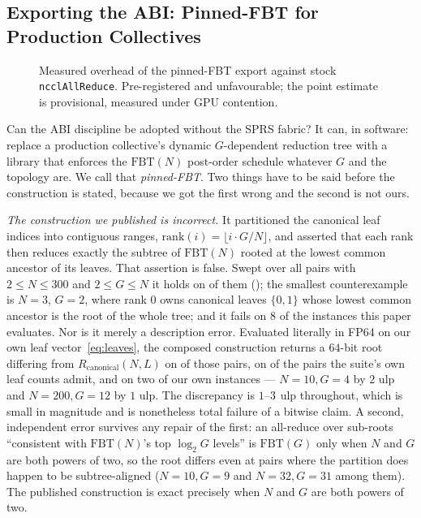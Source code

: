\documentclass[journal,10pt]{IEEEtran}
\theoremstyle{plain}
\theoremstyle{definition}
\theoremstyle{remark}
\newcommand{\FBT}{\ensuremath{\mathrm{FBT}}}
\newcommand{\Rcan}{\ensuremath{R_{\mathrm{canonical}}}}
\newcommand{\sprs}{\textsc{SPRS}}
\begin{document}
\subsection{Exporting the ABI: Pinned-FBT for Production Collectives}\label{sec:discussion-pinfbt}

\begin{figure}[!t]\centering

\caption{Measured overhead of the pinned-FBT export against stock \texttt{ncclAllReduce}. Pre-registered and unfavourable; the point estimate is provisional, measured under GPU contention.}\label{fig:exportcost}
\end{figure}


Can the ABI discipline be adopted without the \sprs{} fabric? It can, in
software: replace a production collective's dynamic $G$-dependent reduction
tree with a library that enforces the $\FBT(N)$ post-order schedule whatever
$G$ and the topology are. We call that \emph{pinned-FBT}. Two things have to
be said before the construction is stated, because we got the first wrong
and the second is not ours.

\emph{The construction we published is incorrect.} It partitioned the
canonical leaf indices into contiguous ranges,
$\mathrm{rank}(i) = \lfloor i \cdot G/N \rfloor$, and asserted that each
rank then reduces exactly the subtree of $\FBT(N)$ rooted at the lowest
common ancestor of its leaves. That assertion is false. Swept over all
\SweepPairs{} pairs with $2 \le N \le 300$ and $2 \le G \le N$ it holds on
\SweepStepOneHolds{} of them (\SweepStepOnePct{}); the smallest counterexample is $N=3$, $G=2$, where rank
$0$ owns canonical leaves $\{0,1\}$ whose lowest common ancestor is the root
of the whole tree; and it fails on $8$ of the \SuiteSize{} instances this
paper evaluates. Nor is it merely a description error. Evaluated literally
in FP64 on our own leaf vector~\eqref{eq:leaves}, the composed construction
returns a $64$-bit root differing from $\Rcan(N,L)$ on \PinIrMismatch{} of
those pairs, on \SweepRootDivergePct{} of the \PinSuitePairs{} pairs the suite's own
leaf counts admit, and on two of our own instances --- $N=10, G=4$ by $2$ ulp
and $N=200, G=12$ by $1$ ulp. The discrepancy is $1$--$3{}$ ulp
throughout, which is small in magnitude and is nonetheless total failure of a
bitwise claim.
A second, independent error survives any repair of the first: an all-reduce
over sub-roots ``consistent with $\FBT(N)$'s top $\log_2 G$ levels'' is
$\FBT(G)$ only when $N$ and $G$ are both powers of two, so the root differs
even at pairs where the partition does happen to be subtree-aligned
($N=10, G=9$ and $N=32, G=31$ among them). The published construction is
exact precisely when $N$ and $G$ are both powers of two.
\end{document}
